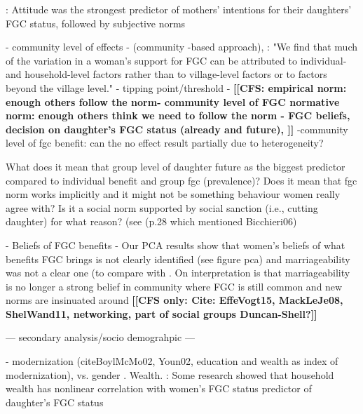\documentclass[12pt,]{article}
\newcommand{\comment}[1]{\textbf{[[#1]]}}
\newcommand{\cfcmt}[1]{\comment{CFS: #1}}
\newcommand{\cfonly}[1]{\comment{CFS only: #1}}
\begin{document}
\cite{PashPonn16}: Attitude was the strongest predictor of mothers' intentions for their daughters' FGC status, followed by subjective norms 

- community level of effects -
\cite{ChegAske04}(community -based approach), \cite{BrowBeec13, Hayf05, KandShel19, PatrSing15, ShelWand11}
\cite{BellNova15}: "We find that much of the variation in a woman's support for FGC can be attributed to individual- and household-level factors rather than to village-level factors or to factors beyond the village level."
- tipping point/threshold -
\cfcmt{empirical norm:  enough others follow the norm-  community level of FGC \cite{Bicc10} normative norm:  enough others think we need to follow the norm -  FGC beliefs, decision on daughter's FGC status (already and future), \cite{Bicc10}}
-community level of fgc benefit:  can the no effect result partially due to heterogeneity?

What does it mean that group level of daughter future as the biggest predictor compared to individual benefit and group fgc (prevalence)?  Does it mean that fgc norm works implicitly and it might not be something behaviour women really agree with?  Is it a social norm supported by social sanction (i.e., cutting daughter) for what reason? (see \cite{MackLeJe08} (p.28 which mentioned Bicchieri06)

- Beliefs of FGC benefits -
Our PCA results show that women’s beliefs of what benefits FGC brings is not clearly identified (see figure pca) and marriageability was not a clear one (to compare with \cite{Mack?,}.  On interpretation is that marriageability is no longer a strong belief in community where FGC is still common and new norms are insinuated around \cfonly{Cite: EffeVogt15, MackLeJe08, ShelWand11, networking, part of social groups Duncan-Shell?}

— secondary analysis/socio demograhpic —

- modernization (cite{BoylMcMo02, Youn02}, education and wealth as index of modernization), vs. gender \cite{DalaLawo10, Dell04, FrieMahm13, Lewi04, Meye00, Njam04, YirgKass12, Youn02}. 
   Wealth.  \cite{Hayf05}: Some research showed that household wealth has nonlinear correlation with women's FGC status predictor of daughter's FGC status

\end{document}

